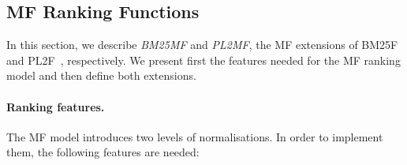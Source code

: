%  		
%  		
%	  	

\subsection{MF Ranking Functions}

In this section, we describe \emph{\gls{BM25MF}} and \emph{\gls{PL2MF}}, the \gls{MF} extensions of BM25F~\cite{zaragoza:2004:microsoft} and PL2F~\cite{macdonald:2005:clef}, respectively.
We present first the features needed for the \gls{MF} ranking model and then define both extensions.

\paragraph{Ranking features.}

The \gls{MF} model introduces two levels of normalisations. In order to implement them, the following features are needed:

